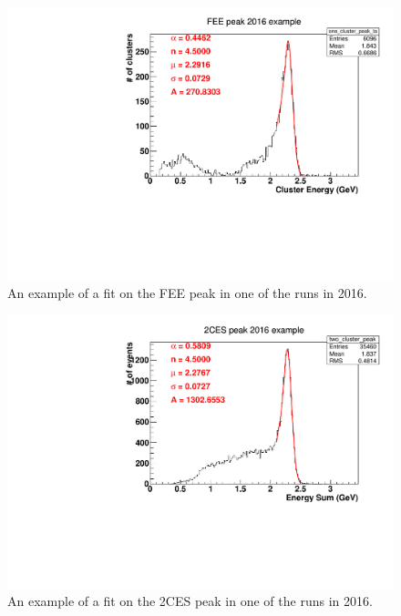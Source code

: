 \documentclass[11pt]{article}
\begin{document}
\begin{figure}[htbp] 
\begin{center}
\includegraphics[width =  .9\textwidth]{figures/one2016_fit_example.pdf}
\caption{An example of a fit on the FEE peak in one of the runs in 2016.} 
\label{fig:one2016_fit_example}
\end{center}
\end{figure}

\begin{figure}[htbp] 
\begin{center}
\includegraphics[width =  .9\textwidth]{figures/two2016_fit_example.pdf}
\caption{An example of a fit on the 2CES peak in one of the runs in 2016.} 
\label{fig:two2016_fit_example}
\end{center}
\end{figure}
\end{document}
